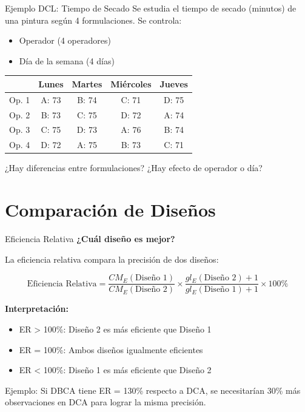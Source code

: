 \documentclass[aspectratio=169]{beamer}
\begin{document}
\begin{frame}{Ejemplo DCL: Tiempo de Secado}
Se estudia el tiempo de secado (minutos) de una pintura según 4 formulaciones. Se controla:
\begin{itemize}
\item Operador (4 operadores)
\item Día de la semana (4 días)
\end{itemize}

\vspace{0.2cm}
\small
\begin{table}
\centering
\begin{tabular}{lcccc}
\toprule
& \textbf{Lunes} & \textbf{Martes} & \textbf{Miércoles} & \textbf{Jueves} \\
\midrule
Op. 1 & A: 73 & B: 74 & C: 71 & D: 75 \\
Op. 2 & B: 73 & C: 75 & D: 72 & A: 74 \\
Op. 3 & C: 75 & D: 73 & A: 76 & B: 74 \\
Op. 4 & D: 72 & A: 75 & B: 73 & C: 71 \\
\bottomrule
\end{tabular}
\end{table}

\vspace{0.3cm}
\normalsize
¿Hay diferencias entre formulaciones? ¿Hay efecto de operador o día?
\end{frame}

\section{Comparación de Diseños}

\begin{frame}{Eficiencia Relativa}
\textbf{¿Cuál diseño es mejor?}

La eficiencia relativa compara la precisión de dos diseños:

$$\text{Eficiencia Relativa} = \frac{CM_E(\text{Diseño 1})}{CM_E(\text{Diseño 2})} \times \frac{gl_E(\text{Diseño 2}) + 1}{gl_E(\text{Diseño 1}) + 1} \times 100\%$$

\vspace{0.3cm}
\textbf{Interpretación:}
\begin{itemize}
\item ER > 100\%: Diseño 2 es más eficiente que Diseño 1
\item ER = 100\%: Ambos diseños igualmente eficientes
\item ER < 100\%: Diseño 1 es más eficiente que Diseño 2
\end{itemize}

\vspace{0.3cm}
Ejemplo: Si DBCA tiene ER = 130\% respecto a DCA, se necesitarían 30\% más observaciones en DCA para lograr la misma precisión.
\end{frame}
\end{document}
